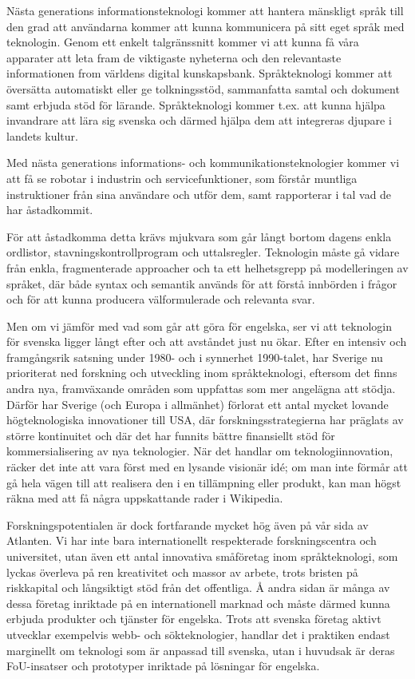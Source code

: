 \begin{multicols}{2}
Nästa generations informationsteknologi kommer att hantera mänskligt
språk till den grad att användarna kommer att kunna kommunicera på
sitt eget språk med teknologin. Genom ett enkelt talgränssnitt kommer
vi att kunna få våra apparater att \mbox{leta} fram de viktigaste nyheterna
och den relevant\-aste informationen from världens digital
kunskapsbank. Språkteknologi kommer att översätta auto\-mat\-iskt \mbox{eller} ge
tolkningsstöd, sammanfatta samtal och doku\-ment samt erbjuda stöd för
lärande. Språkteknologi kommer t.ex. att kunna hjälpa invandrare att
lära sig svenska och därmed hjälpa dem att integrer\-as djupare i
landets kultur.

Med nästa generations informations- och kom\-muni\-ka\-tions\-teknologier
kommer vi att få se robotar i indust\-rin och service\-funktioner, som
förstår munt\-liga instruktioner från sina användare och utför dem, samt
rapporterar i tal vad de har åstadkommit.

För att åstadkomma detta krävs mjukvara som går långt bortom dagens
enkla ordlistor, stavnings\-kontroll\-program och uttalsregler. Teknologin
måste gå vidare från enkla, fragmenterade approacher och ta ett
helhetsgrepp på modelleringen av språket, där både syntax och semantik
används för att förstå innbörden i frågor och för att kunna producera
väl\-formu\-lerade och relevanta svar.

Men om vi jämför med vad som går att göra för engelska, ser vi att
teknologin för svenska ligger långt efter och att avståndet just nu
ökar. Efter en \mbox{intensiv} och framgångsrik satsning under 1980- och i
synnerhet 1990-talet, har Sverige nu prioriterat ned forskning och
utveckling inom språkteknologi, efter\-som det finns andra nya,
framväxande områden som uppfattas som mer angelägna att stödja.
Därför har Sverige (och Europa i allmänhet) förlorat ett antal mycket
lovande högteknologiska innovationer till USA, där
forskningsstrategierna har präglats av större kontinuitet och där det
har funnits bättre finansiellt stöd för kommersialisering av nya
teknologier. När det handlar om teknologiinnovation, räcker det inte
att vara först med en lysande visionär idé; om man inte förmår att gå
hela vägen till att realisera den i en tillämpning eller produkt, kan
man högst räkna med att få några uppskattande rader i Wikipedia.

Forskningspotentialen är dock fortfarande mycket hög även på vår sida
av Atlanten. Vi har inte \mbox{bara} inter\-nation\-ellt respekterade
forskningscentra och universitet, utan även ett antal innovativa
små\-före\-tag inom språkteknologi, som lyckas överleva på ren kreativitet
och massor av arbete, trots bristen på riskkapital och långsiktigt
stöd från det offent\-liga. Å andra sidan är många av dessa företag
inriktade på en internationell marknad och måste därmed kunna erbjuda
produkter och tjänster för engelska. Trots att svenska företag aktivt
utvecklar exempelvis webb- och sökteknologier, handlar det i prak\-tik\-en
endast marginellt om teknologi som är anpassad till \mbox{svenska}, utan i
huvudsak är deras FoU-insatser och prototyper inriktade på lösningar
för engelska.


\end{multicols}

